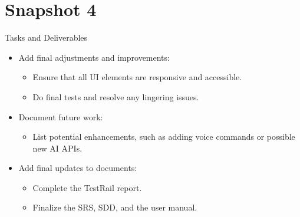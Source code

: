 \documentclass{article}
\begin{document}
\section{Snapshot 4}
Tasks and Deliverables
\begin{itemize}
    \item Add final adjustments and improvements:
    \begin{itemize}
        \item Ensure that all UI elements are responsive and accessible.
        \item Do final tests and resolve any lingering issues.
    \end{itemize}
    \item Document future work:
    \begin{itemize}
        \item List potential enhancements, such as adding voice commands or possible new AI APIs.
    \end{itemize}
    \item Add final updates to documents:
    \begin{itemize}
        \item Complete the TestRail report.
        \item Finalize the SRS, SDD, and the user manual.
    \end{itemize}
\end{itemize}
\end{document}
